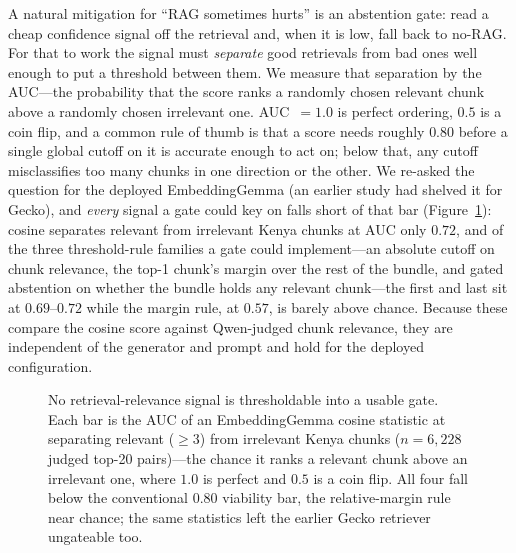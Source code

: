 A natural mitigation for ``RAG sometimes hurts'' is an abstention gate: read a
cheap confidence signal off the retrieval and, when it is low, fall back to
no-RAG. For that to work the signal must \emph{separate} good retrievals from
bad ones well enough to put a threshold between them. We measure that
separation by the AUC---the probability that the score ranks a randomly chosen
relevant chunk above a randomly chosen irrelevant one. AUC~$=1.0$ is perfect
ordering, $0.5$ is a coin flip, and a common rule of thumb is that a score
needs roughly $0.80$ before a single global cutoff on it is accurate enough to
act on; below that, any cutoff misclassifies too many chunks in one direction
or the other. We re-asked the question for the deployed EmbeddingGemma (an
earlier study had shelved it for Gecko), and \emph{every} signal a gate could
key on falls short of that bar (Figure~\ref{fig:gate-auc}): cosine separates
relevant from irrelevant Kenya chunks at AUC only $0.72$, and of the three
threshold-rule families a gate could implement---an absolute cutoff on chunk
relevance, the top-1 chunk's margin over the rest of the bundle, and gated
abstention on whether the bundle holds any relevant chunk---the first and last
sit at $0.69$--$0.72$ while the margin rule, at $0.57$, is barely above
chance. Because these compare the
cosine score against Qwen-judged chunk relevance, they are independent of the
generator and prompt and hold for the deployed configuration.

\begin{figure}[t]
\centering
{}
\caption{No retrieval-relevance signal is thresholdable into a usable gate.
Each bar is the AUC of an EmbeddingGemma cosine statistic at separating
relevant ($\ge3$) from irrelevant Kenya chunks ($n=6{,}228$ judged top-20
pairs)---the chance it ranks a relevant chunk above an irrelevant one, where
$1.0$ is perfect and $0.5$ is a coin flip. All four fall below the
conventional $0.80$ viability bar, the relative-margin rule near chance; the
same statistics left the earlier Gecko retriever ungateable too.}
\label{fig:gate-auc}
\end{figure}

